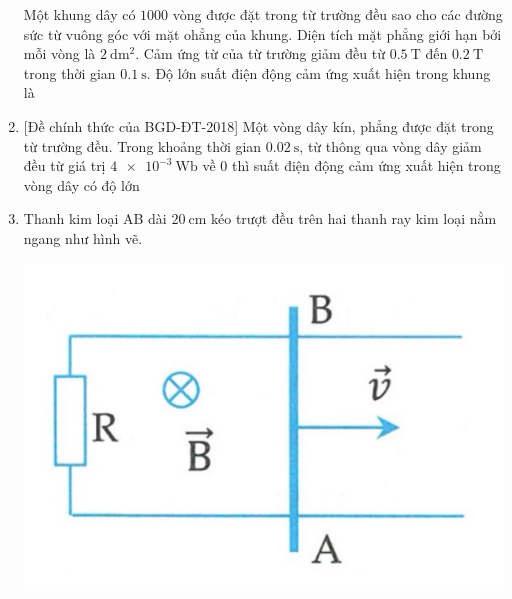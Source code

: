 \begin{enumerate}
	{
		Một khung dây có $1000$ vòng được đặt trong từ trường đều sao cho các đường sức từ vuông góc với mặt ohẳng của khung. Diện tích mặt phẳng giới hạn bởi mỗi vòng là $\SI{2}{\deci \meter \squared}$. Cảm ứng từ của từ trường giảm đều từ $\SI{0.5}{\tesla}$ đến $\SI{0.2}{\tesla}$ trong thời gian $\SI{0.1}{\second}$. Độ lớn suất điện động cảm ứng xuất hiện trong khung là
	}
	\item
	{
		[Đề chính thức của BGD-ĐT-2018] Một vòng dây kín, phẳng được đặt trong từ trường đều. Trong khoảng thời gian $\SI{0.02}{\second}$, từ thông qua vòng dây giảm đều từ giá trị $\SI{4e-3}{\weber}$ về $0$ thì suất điện động cảm ứng xuất hiện trong vòng dây có độ lớn
	}
	\item
	{
		Thanh kim loại AB dài $\SI{20}{\centi \meter}$ kéo trượt đều trên hai thanh ray kim loại nằm ngang như hình vẽ.
		\begin{center}
		\includegraphics[scale=0.4]{../figs/VN11-PH-30-P-0201-1.jpg}
		\end{center}
}
\end{enumerate}
